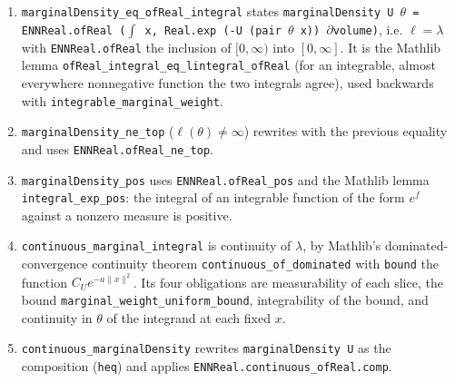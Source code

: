 \documentclass[11pt,a4paper]{article}
\begin{document}
\begin{leanbox}
\begin{enumerate}
\item \texttt{marginal\allowbreak{}Density\_\allowbreak{}eq\_\allowbreak{}of\allowbreak{}Real\_\allowbreak{}integral} states \texttt{marginal\allowbreak{}Density U \ensuremath{\theta} = ENNReal.\allowbreak{}of\allowbreak{}Real (\ensuremath{\int} x, Real.\allowbreak{}exp (-\allowbreak{}U (pair \ensuremath{\theta} x)) \ensuremath{\partial}volume)}, i.e. \(\ell=\lambda\) with \texttt{ENNReal.\allowbreak{}of\allowbreak{}Real} the inclusion of \([0,\infty)\) into \([0,\infty]\). It is the Mathlib lemma \texttt{of\allowbreak{}Real\_\allowbreak{}integral\_\allowbreak{}eq\_\allowbreak{}lintegral\_\allowbreak{}of\allowbreak{}Real} (for an integrable, almost everywhere nonnegative function the two integrals agree), used backwards with \texttt{integrable\_\allowbreak{}marginal\_\allowbreak{}weight}.

\item \texttt{marginal\allowbreak{}Density\_\allowbreak{}ne\_\allowbreak{}top} (\(\ell(\theta)\ne\infty\)) rewrites with the previous equality and uses \texttt{ENNReal.\allowbreak{}of\allowbreak{}Real\_\allowbreak{}ne\_\allowbreak{}top}.

\item \texttt{marginal\allowbreak{}Density\_\allowbreak{}pos} uses \texttt{ENNReal.\allowbreak{}of\allowbreak{}Real\_\allowbreak{}pos} and the Mathlib lemma \texttt{integral\_\allowbreak{}exp\_\allowbreak{}pos}: the integral of an integrable function of the form \(e^{f}\) against a nonzero measure is positive.

\item \texttt{continuous\_\allowbreak{}marginal\_\allowbreak{}integral} is continuity of \(\lambda\), by Mathlib's dominated-convergence continuity theorem \texttt{continuous\_\allowbreak{}of\_\allowbreak{}dominated} with \texttt{bound} the function \(C_Ue^{-a\|x\|^2}\). Its four obligations are measurability of each slice, the bound \texttt{marginal\_\allowbreak{}weight\_\allowbreak{}uniform\_\allowbreak{}bound}, integrability of the bound, and continuity in \(\theta\) of the integrand at each fixed \(x\).

\item \texttt{continuous\_\allowbreak{}marginal\allowbreak{}Density} rewrites \texttt{marginal\allowbreak{}Density U} as the composition (\texttt{heq}) and applies \texttt{ENNReal.\allowbreak{}continuous\_\allowbreak{}of\allowbreak{}Real.\allowbreak{}comp}.

\end{enumerate}
\end{leanbox}
\end{document}
